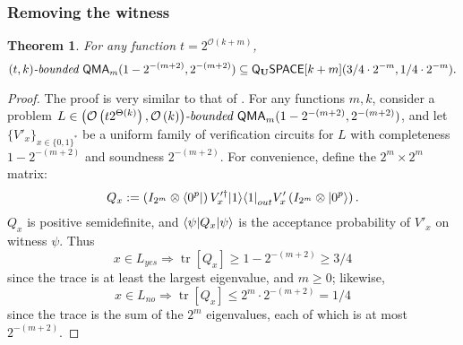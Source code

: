 \documentclass[11pt]{article}
\newtheorem{theorem}{Theorem}
\theoremstyle{definition}
\theoremstyle{remark}
\newcommand\QMA{{\sf{QMA}}}
\newcommand\bddQMA[5]{{\left(#1,#2\right)}\textit{-bounded }\QMA_{#3}(#4,#5)}
\newcommand{\classfont}{\sf}
\newcommand{\Unitary}{\mathbf{U}}
\newcommand{\unitaryQSPACE}[3]{{\classfont{Q}_\Unitary\classfont{SPACE}}[#1](#2,#3)}
\newcommand\bigoh{\mathcal{O}}
\DeclareMathOperator{\tr}{tr}
\begin{document}
\subsubsection{Removing the witness}
\begin{theorem} \label{thm:pqpspace simulation} For any function $t=2^{\bigoh(k+m)}$,
\[
\bddQMA{t}{k}{m}{1-2^{-(m+2)}}{2^{-(m+2)}}\subseteq
\unitaryQSPACE{k+m}{3/4\cdot 2^{-m}}{1/4 \cdot 2^{-m}}.
\]
\end{theorem}
\begin{proof}
The proof is very similar to that of \cite[Theorem 3.6]{mw05}. For any functions $m, k$, consider a problem $L\in\bddQMA{\mathcal{O}\left(t2^{\Theta(k)}\right)}{\mathcal{O}\left(k\right)}{m}{1-2^{-(m+2)}}{2^{-(m+2)}}$, and let $\{V'_x\}_{x\in\{0,1\}^*}$ be a uniform family of verification circuits for $L$ with completeness $1-2^{-(m+2)}$ and soundness $2^{-(m+2)}$. 
For convenience, define the $2^m \times 2^m$ matrix:
\begin{equation}
Q_x := \left(I_{2^m}\otimes {\left\langle{0^p}\right\vert}\right) V'^\dagger_x {\left\vert{1}\right\rangle}{\left\langle{1}\right\vert}_{out} V'_x \left(I_{2^m}\otimes {\left\vert{0^p}\right\rangle}\right).
\end{equation}
$Q_x$ is positive semidefinite, and ${\left\langle{\psi}\right\vert}Q_x{\left\vert{\psi}\right\rangle}$ is the acceptance probability of $V'_x$ on witness $\psi$. Thus
\begin{equation}
x\in L_{yes} \Rightarrow \tr[Q_x]\ge 1 - 2^{-(m+2)} \ge 3/4
\end{equation}
since the trace is at least the largest eigenvalue, and $m\geq 0$; likewise,
\begin{equation}
x\in L_{no} \Rightarrow \tr[Q_x]\le 2^m \cdot 2^{-(m+2)} = 1/4
\end{equation}
since the trace is the sum of the $2^m$ eigenvalues, each of which is at most $2^{-(m+2)}$. 


\end{proof}
\end{document}

